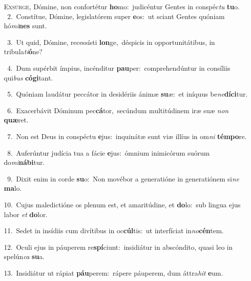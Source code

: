 \lettrine{\initial\textcolor{\initialcolor}{E}}{xsúrge,} Dómine, non confortétur \textbf{ho}\-mo:~\star judicéntur Gentes in conspéc\textit{tu} \textbf{tu}\-o.\\
{\numbfont\textcolor{\numbcolor}{~2.}}~Constítue, Dómine, legislatórem super \textbf{e}\-os:~\star ut sciant Gentes quóniam hó\-\textit{mi}\-\textbf{nes} sunt.\par
{\numbfont\textcolor{\numbcolor}{~3.}}~Ut quid, Dómine, recessísti \textbf{lon}\-ge,~\star déspicis in opportunitátibus, in tribula\-\textit{ti}\-\textbf{ó}ne?\par
{\numbfont\textcolor{\numbcolor}{~4.}}~Dum supérbit ímpius, incénditur \textbf{pau}\-per:~\star comprehendúntur in consíliis qui\textit{bus} \textbf{có}\-\textbf{gi}tant.\par
{\numbfont\textcolor{\numbcolor}{~5.}}~Quóniam laudátur peccátor in desidériis ánimæ \textbf{su}\-æ:~\star et iníquus be\-\textit{ne}\-\textbf{dí}\textbf{ci}tur.\par
{\numbfont\textcolor{\numbcolor}{~6.}}~Exacerbávit Dóminum pec\-\textbf{cá}\-tor,~\star secúndum multitúdinem iræ suæ \textit{non} \textbf{quæ}\-ret.\par
{\numbfont\textcolor{\numbcolor}{~7.}}~Non est Deus in conspéctu \textbf{e}\-jus:~\star inquinátæ sunt viæ illíus in om\textit{ni} \textbf{tém}\-\textbf{po}re.\par
{\numbfont\textcolor{\numbcolor}{~8.}}~Auferúntur judícia tua a fácie \textbf{e}\-jus:~\star ómnium inimicórum suórum do\-\textit{mi}\-\textbf{ná}\textbf{bi}tur.\par
{\numbfont\textcolor{\numbcolor}{~9.}}~Dixit enim in corde \textbf{su}\-o:~\star Non movébor a generatióne in generatiónem si\textit{ne} \textbf{ma}\-lo.\par
{\numbfont\textcolor{\numbcolor}{10.}}~Cujus maledictióne os plenum est, et amaritúdine, et \textbf{do}\-lo:~\star sub lingua ejus labor \textit{et} \textbf{do}\-lor.\par
{\numbfont\textcolor{\numbcolor}{11.}}~Sedet in insídiis cum divítibus in oc\-\textbf{cúl}\-tis:~\star ut interfíciat in\-\textit{no}\-\textbf{cén}tem.\par
{\numbfont\textcolor{\numbcolor}{12.}}~Oculi ejus in páuperem re\-\textbf{spí}\-ciunt:~\star insidiátur in abscóndito, quasi leo in spelún\textit{ca} \textbf{su}\-a.\par
{\numbfont\textcolor{\numbcolor}{13.}}~Insidiátur ut rápiat \textbf{páu}\-perem:~\star rápere páuperem, dum áttra\textit{hit} \textbf{e}\-um.\par
